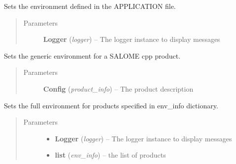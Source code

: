\documentclass[a4paper,10pt,english]{sphinxmanual}
\begin{document}
\begin{fulllineitems}
\begin{fulllineitems}
\label{commands/apidoc/src:src.environment.SalomeEnviron.set_application_env}
Sets the environment defined in the APPLICATION file.
\begin{quote}\begin{description}
\item[{Parameters}] \leavevmode
\textbf{Logger} (\emph{logger}) -- The logger instance to display messages

\end{description}\end{quote}

\end{fulllineitems}


\begin{fulllineitems}
\label{commands/apidoc/src:src.environment.SalomeEnviron.set_cpp_env}
Sets the generic environment for a SALOME cpp product.
\begin{quote}\begin{description}
\item[{Parameters}] \leavevmode
\textbf{Config} (\emph{product\_info}) -- The product description

\end{description}\end{quote}

\end{fulllineitems}


\begin{fulllineitems}
\label{commands/apidoc/src:src.environment.SalomeEnviron.set_full_environ}
Sets the full environment for products 
specified in env\_info dictionary.
\begin{quote}\begin{description}
\item[{Parameters}] \leavevmode\begin{itemize}
\item {} 
\textbf{Logger} (\emph{logger}) -- The logger instance to display messages

\item {} 
\textbf{list} (\emph{env\_info}) -- the list of products


\end{itemize}
\end{description}
\end{quote}
\end{fulllineitems}
\end{fulllineitems}
\end{document}
